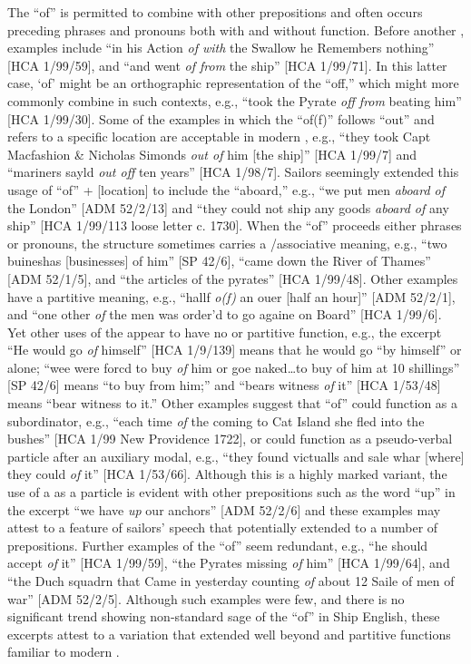 The  “of” is permitted to combine with other prepositions and often occurs preceding  phrases and pronouns both with and without  function. Before another , examples include “in his Action \textit{of with} the Swallow he Remembers nothing” [HCA 1/99/59], and “and went \textit{of from} the ship” [HCA 1/99/71].  In this latter case, ‘of’ might be an orthographic representation of the  “off,” which might more commonly combine in such contexts, e.g., “took the Pyrate \textit{off from} beating him” [HCA 1/99/30]. Some of the examples in which the  “of(f)” follows “out” and refers to a specific location are acceptable in modern , e.g., “they took Capt Macfashion \& Nicholas Simonds \textit{out of} him [the ship]” [HCA 1/99/7] and “mariners sayld \textit{out off}  ten years” [HCA 1/98/7]. Sailors seemingly extended this usage of “of” + [location] to include the  “aboard,” e.g., “we put men \textit{aboard of} the London” [ADM 52/2/13] and “they could not ship any goods \textit{aboard of} any ship” [HCA 1/99/113 loose letter c. 1730]. When the  “of” proceeds either  phrases or pronouns, the structure sometimes carries a /associative meaning, e.g., “two buineshas [businesses] of him” [SP 42/6], “came down the River of Thames” [ADM 52/1/5], and “the articles of the pyrates” [HCA 1/99/48]. Other examples have a partitive meaning, e.g., “hallf \textit{o(f)} an ouer [half an hour]” [ADM 52/2/1], and “one other \textit{of} the men was order’d to go againe on Board” [HCA 1/99/6]. Yet other uses of the  appear to have no  or partitive function, e.g., the excerpt “He would go \textit{of} himself” [HCA 1/9/139] means that he would go “by himself” or alone; “wee were forcd to buy \textit{of} him or goe naked…to buy of him at 10 shillings” [SP 42/6] means “to buy from him;” and “bears witness \textit{of} it” [HCA 1/53/48] means “bear witness to it.” Other examples suggest that “of” could function as a subordinator, e.g., “each time \textit{of} the  coming to Cat Island she fled into the bushes” [HCA 1/99 New Providence 1722], or could function as a pseudo-verbal particle after an auxiliary modal, e.g., “they found victualls and sale whar [where] they could \textit{of} it” [HCA 1/53/66]. Although this is a highly marked variant, the use of a  as a  particle is evident with other prepositions such as the word “up” in the excerpt “we have \textit{up} our anchors” [ADM 52/2/6] and these examples may attest to a feature of sailors’ speech that potentially extended to a number of prepositions. Further examples of the  “of” seem redundant, e.g., “he should accept \textit{of} it” [HCA 1/99/59], “the Pyrates missing \textit{of} him” [HCA 1/99/64], and “the Duch squadrn that Came in yesterday counting \textit{of} about 12 Saile of men of war” [ADM 52/2/5]. Although such examples were few, and there is no significant trend showing non-standard sage of the  “of” in Ship English, these excerpts attest to a variation that extended well beyond  and partitive functions familiar to modern . 

